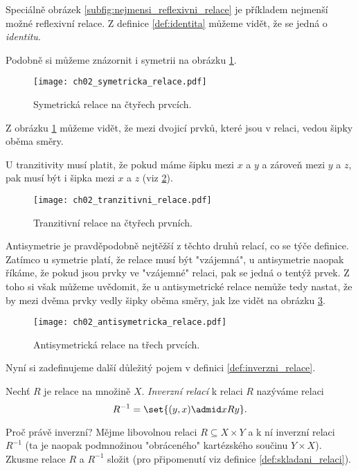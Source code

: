 Speciálně obrázek \ref{subfig:nejmensi_reflexivni_relace} je příkladem nejmenší možné reflexivní relace. Z definice \ref{def:identita} můžeme vidět, že se jedná o \emph{identitu}.\par
Podobně si můžeme znázornit i symetrii na obrázku \ref{fig:priklad_symetricke_relace}.
\begin{figure}[H]
    \centering
    \texttt{[image: ch02\_symetricka\_relace.pdf]}
    \caption{Symetrická relace na čtyřech prvcích.}
    \label{fig:priklad_symetricke_relace}
\end{figure}
Z obrázku \ref{fig:priklad_symetricke_relace} můžeme vidět, že mezi dvojicí prvků, které jsou v relaci, vedou šipky oběma směry.\par
U tranzitivity musí platit, že pokud máme šipku mezi $x$ a $y$ a zároveň mezi $y$ a $z$, pak musí být i šipka mezi $x$ a $z$ (viz \ref{fig:priklad_tranzitivni_relace}).
\begin{figure}[H]
    \centering
    \texttt{[image: ch02\_tranzitivni\_relace.pdf]}
    \caption{Tranzitivní relace na čtyřech prvních.}
    \label{fig:priklad_tranzitivni_relace}
\end{figure}
Antisymetrie je pravděpodobně nejtěžší z těchto druhů relací, co se týče definice. Zatímco u symetrie platí, že relace musí být "vzájemná", u antisymetrie naopak říkáme, že pokud jsou prvky ve "vzájemné" relaci, pak se jedná o tentýž prvek. Z toho si však můžeme uvědomit, že u antisymetrické relace nemůže tedy nastat, že by mezi dvěma prvky vedly šipky oběma směry, jak lze vidět na obrázku \ref{fig:priklad_antisymetricke_relace}.
\begin{figure}[H]
    \centering
    \texttt{[image: ch02\_antisymetricka\_relace.pdf]}
    \caption{Antisymetrická relace na třech prvcích.}
    \label{fig:priklad_antisymetricke_relace}
\end{figure} 
Nyní si zadefinujeme další důležitý pojem v definici \ref{def:inverzni_relace}.
\begin{definition}\label{def:inverzni_relace}
    Nechť $R$ je relace na množině $X$. \emph{Inverzní relací} k relaci $R$ nazýváme relaci
    \begin{equation*}
        R^{-1}=\set{(y,x) \admid xRy}.
    \end{equation*}
\end{definition}
Proč právě inverzní? Mějme libovolnou relaci $R\subseteq X\times Y$ a k ní inverzní relaci $R^{-1}$ (ta je naopak podmnožinou "obráceného" kartézského součinu $Y\times X$). Zkusme relace $R$ a $R^{-1}$ složit (pro připomenutí viz definice \ref{def:skladani_relaci}).

